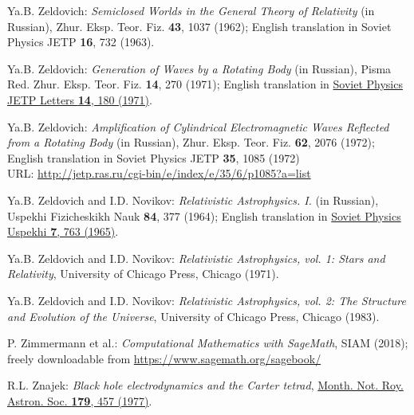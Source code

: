 \begin{thebibliography}{123}
Ya.B. Zeldovich:
{\em Semiclosed Worlds in the General Theory of Relativity} (in Russian),
Zhur. Eksp. Teor. Fiz. {\bf 43}, 1037 (1962); English translation in
Soviet Physics JETP {\bf 16}, 732 (1963).

Ya.B. Zeldovich:
{\em Generation of Waves by a Rotating Body} (in Russian),
Pisma Red. Zhur. Eksp. Teor. Fiz. {\bf 14}, 270 (1971); English translation in
\href{http://jetpletters.ru/ps/0/article_24607.shtml}{Soviet Physics JETP Letters {\bf 14}, 180 (1971)}.

Ya.B. Zeldovich:
{\em Amplification of Cylindrical Electromagnetic Waves Reflected from a Rotating Body} (in Russian),
Zhur. Eksp. Teor. Fiz. {\bf 62}, 2076 (1972); English translation in
Soviet Physics JETP {\bf 35}, 1085 (1972)\\
URL: \url{http://jetp.ras.ru/cgi-bin/e/index/e/35/6/p1085?a=list}

Ya.B. Zeldovich and I.D. Novikov:
{\em Relativistic Astrophysics. I.} (in Russian),
Uspekhi Fizicheskikh Nauk {\bf 84}, 377 (1964);
English translation in \href{https://doi.org/10.1070/PU1965v007n06ABEH003683}{Soviet Physics Uspekhi {\bf 7}, 763 (1965)}.

Ya.B. Zeldovich and I.D. Novikov:
{\em Relativistic Astrophysics, vol. 1: Stars and Relativity},
University of Chicago Press, Chicago (1971).

Ya.B. Zeldovich and I.D. Novikov:
{\em Relativistic Astrophysics, vol. 2: The Structure and Evolution of the Universe},
University of Chicago Press, Chicago (1983).

P. Zimmermann et al.: {\em Computational Mathematics with SageMath}, SIAM (2018);
freely downloadable from \url{https://www.sagemath.org/sagebook/}

R.L. Znajek:
{\em Black hole electrodynamics and the Carter tetrad},
\href{https://doi.org/10.1093/mnras/179.3.457}{Month. Not. Roy. Astron. Soc. {\bf 179}, 457 (1977)}.

\end{thebibliography}
